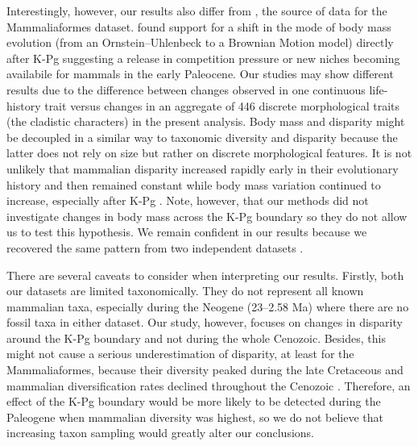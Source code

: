 Interestingly, however, our results also differ from \cite{Slater2012MEE}, the source of data for the Mammaliaformes dataset.
\cite{Slater2012MEE} found support for a shift in the mode of body mass evolution (from an Ornstein--Uhlenbeck to a Brownian Motion model) directly after K-Pg suggesting a release in competition pressure or new niches becoming availabile for mammals in the early Paleocene.
Our studies may show different results due to the difference between changes observed in one continuous life-history trait \citep[body mass;][]{Slater2012MEE} versus changes in an aggregate of 446 discrete morphological traits (the cladistic characters) in the present analysis.
Body mass and disparity might be decoupled in a similar way to taxonomic diversity and disparity \citep[e.g.][]{slaterCetacean,ruta2013,hopkinsdecoupling2013} because the latter does not rely on size but rather on discrete morphological features.
It is not unlikely that mammalian disparity increased rapidly early in their evolutionary history and then remained constant \citep[Fig \ref{fig:Fig_Raw_results};][]{Close2015,Lee2015R759} while body mass variation continued to increase, especially after K-Pg \citep{Slater2012MEE}.
Note, however, that our methods did not investigate changes in body mass across the K-Pg boundary so they do not allow us to test this hypothesis.
We remain confident in our results because we recovered the same pattern from two independent datasets \citep{Slater2012MEE,beckancient2014}.

There are several caveats to consider when interpreting our results. 
Firstly, both our datasets are limited taxonomically.
They do not represent all known mammalian taxa, especially during the Neogene (23--2.58 Ma) where there are no fossil taxa in either dataset.
Our study, however, focuses on changes in disparity around the K-Pg boundary and not during the whole Cenozoic.
Besides, this might not cause a serious underestimation of disparity, at least for the Mammaliaformes, because their diversity peaked during the late Cretaceous \citep[Campanian; 72.1--83.6 Ma;][]{Newham201432} and mammalian diversification rates declined throughout the Cenozoic \citep{Raia2012}.
Therefore, an effect of the K-Pg boundary would be more likely to be detected during the Paleogene when mammalian diversity was highest, so we do not believe that increasing taxon sampling would greatly alter our conclusions.


